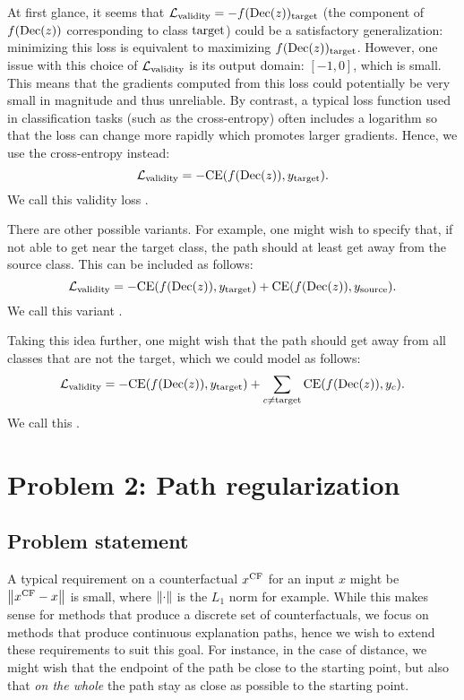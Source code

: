 \documentclass[../main.tex]{subfiles}
\begin{document}
At first glance, it seems that $\mathcal{L}_\text{validity} = -f(\operatorname{Dec}(z))_{\mathrm{target}}$ (the component of $f(\operatorname{Dec}(z))$ corresponding to class $\mathrm{target}$) could be a satisfactory generalization: minimizing this loss is equivalent to maximizing $f(\operatorname{Dec}(z))_{\mathrm{target}}$.
However, one issue with this choice of $\mathcal{L}_\text{validity}$ is its output domain: $[-1, 0]$, which is small. This means that the gradients computed from this loss could potentially be very small in magnitude and thus unreliable.
By contrast, a typical loss function used in classification tasks (such as the cross-entropy) often includes a logarithm so that the loss can change more rapidly which promotes larger gradients. \citenote{}
Hence, we use the cross-entropy instead: $$\mathcal{L}_\text{validity} = -\text{CE}(f(\operatorname{Dec}(z)), y_{\mathrm{target}}).$$
We call this validity loss .

There are other possible variants. For example, one might wish to specify that, if not able to get near the target class, the path should at least get away from the source class. This can be included as follows:
$$\mathcal{L}_\text{validity} = -\text{CE}(f(\operatorname{Dec}(z)), y_{\mathrm{target}}) + \text{CE}(f(\operatorname{Dec}(z)), y_{\mathrm{source}}).$$
We call this variant .

Taking this idea further, one might wish that the path should get away from all classes that are not the target, which we could model as follows:
$$\mathcal{L}_\text{validity} = -\text{CE}(f(\operatorname{Dec}(z)), y_{\mathrm{target}}) + \sum_{c \neq \mathrm{target}} \text{CE}(f(\operatorname{Dec}(z)), y_c).$$
We call this . 


\section{Problem 2: Path regularization}

\subsection{Problem statement}

A typical requirement on a counterfactual $x^\text{CF}$ for an input $x$ might be $\left\lVert x^\text{CF} - x\right\rVert$ is small, where $\left\lVert\cdot\right\rVert$ is the $L_1$ norm for example.
While this makes sense for methods that produce a discrete set of counterfactuals, we focus on methods that produce continuous explanation paths, hence we wish to extend these requirements to suit this goal.
For instance, in the case of distance, we might wish that the endpoint of the path be close to the starting point, but also that \emph{on the whole} the path stay as close as possible to the starting point.
\end{document}
